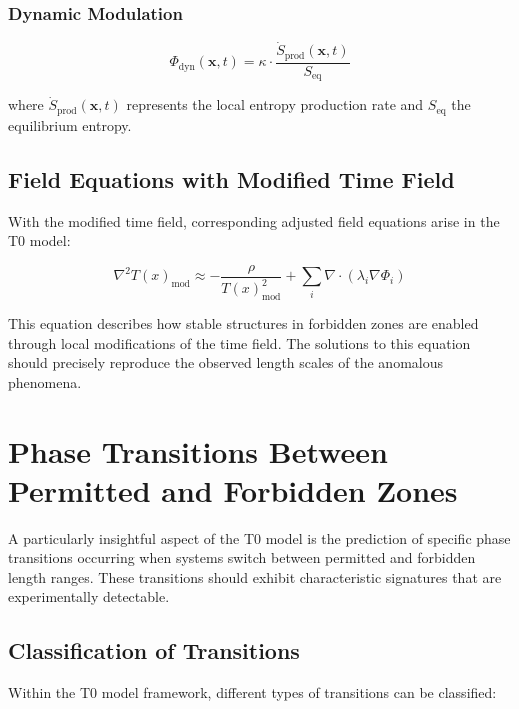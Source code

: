 \documentclass[12pt,a4paper]{article}
\newcommand{\Tfield}{T(x)}
\begin{document}
	\subsubsection{Dynamic Modulation}
	
	\begin{equation}
		\Phi_{\text{dyn}}(\mathbf{x}, t) = \kappa \cdot \frac{\dot{S}_{\text{prod}}(\mathbf{x}, t)}{S_{\text{eq}}}
	\end{equation}
	
	where $\dot{S}_{\text{prod}}(\mathbf{x}, t)$ represents the local entropy production rate and $S_{\text{eq}}$ the equilibrium entropy.
	
	\subsection{Field Equations with Modified Time Field}
	
	With the modified time field, corresponding adjusted field equations arise in the T0 model:
	
	\begin{equation}
		\nabla^2\Tfield_{\text{mod}} \approx -\frac{\rho}{\Tfield_{\text{mod}}^2} + \sum_i \nabla \cdot \left( \lambda_i \nabla \Phi_i \right)
	\end{equation}
	
	This equation describes how stable structures in forbidden zones are enabled through local modifications of the time field. The solutions to this equation should precisely reproduce the observed length scales of the anomalous phenomena.
	
	\section{Phase Transitions Between Permitted and Forbidden Zones}
	
	A particularly insightful aspect of the T0 model is the prediction of specific phase transitions occurring when systems switch between permitted and forbidden length ranges. These transitions should exhibit characteristic signatures that are experimentally detectable.
	
	\subsection{Classification of Transitions}
	
	Within the T0 model framework, different types of transitions can be classified:
	
\end{document}
